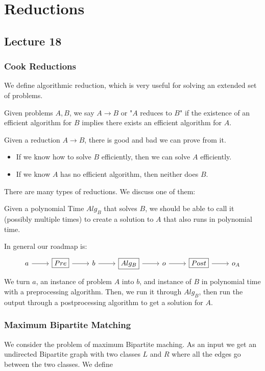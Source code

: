 \section{Reductions}
\subsection{Lecture 18}

\subsubsection{Cook Reductions}
We define algorithmic reduction, which is very useful for solving an extended set of problems.

\begin{definition}[Reduction]
    Given problems $A, B$, we say $A \to B$ or "$A$ reduces to $B$" if the existence of an efficient algorithm for $B$
    implies there exists an efficient algorithm for $A$.
\end{definition}

Given a reduction $A \to B$, there is good and bad we can prove from it.
\begin{itemize}
    \item If we know how to solve $B$ efficiently, then we can solve $A$ efficiently.
    \item If we know $A$ has no efficient algorithm, then neither does $B$.
\end{itemize}

There are many types of reductions. We discuss one of them:
\begin{definition}
    Given a polynomial Time $Alg_B$ that solves $B$, we should be able to call it (possibly multiple times) to create a solution to $A$ that also runs in polynomial time.
\end{definition}

In general our roadmap is:
\[\begin{tikzcd}
	a & {\boxed{Pre}} & b & {\boxed{Alg_B}} & o & {\boxed{Post}} & o_A
	\arrow[from=1-1, to=1-2]
	\arrow[from=1-2, to=1-3]
	\arrow[from=1-3, to=1-4]
	\arrow[from=1-4, to=1-5]
	\arrow[from=1-5, to=1-6]
	\arrow[from=1-6, to=1-7]
\end{tikzcd}\]
We turn $a$, an instance of problem $A$ into $b$, and instance of $B$ in polynomial time with a preprocessing algorithm. Then,
we run it through $Alg_B$, then run the output through a postprocessing algorithm to get a solution for $A$.

\subsubsection{Maximum Bipartite Matching}
We consider the problem of maximum Bipartite maching. As an input we get an undirected Bipartite graph with two classes $L$ and $R$
where all the edges go between the two classes. We define

